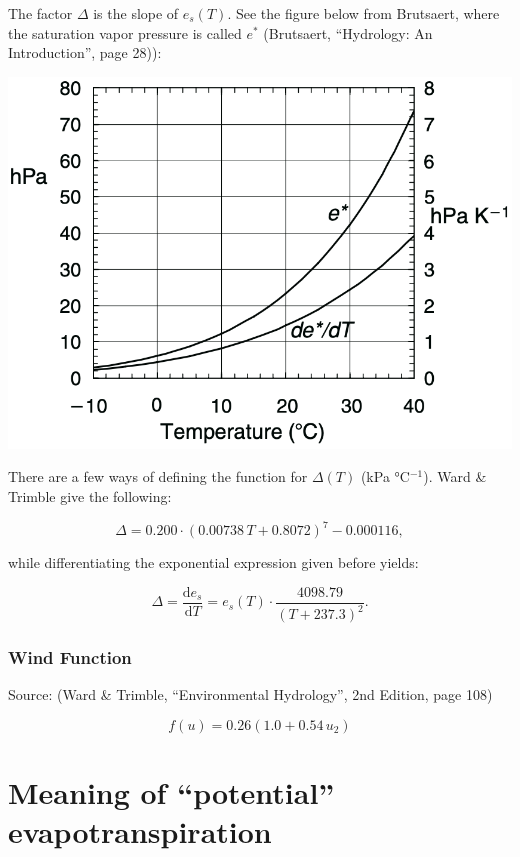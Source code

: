 \documentclass[
  letterpaper,
  DIV=11,
  numbers=noendperiod]{scrreprt}
\begin{document}
The factor \(\Delta\) is the slope of \(e_s(T)\). See the figure below
from Brutsaert, where the saturation vapor pressure is called \(e^*\)
(Brutsaert, ``Hydrology: An Introduction'', page 28)):

\includegraphics{archive/figures/brutsaert-fig2.1.png}

There are a few ways of defining the function for \(\Delta(T)\) (kPa
°C\(^{-1}\)). Ward \& Trimble give the following:

\[
  \begin{equation}
    \Delta = 0.200 \cdot (0.00738\,T + 0.8072)^7 - 0.000116,
  \end{equation}
\]

while differentiating the exponential expression given before yields:

\[
  \begin{equation}
    \Delta = \frac{\text{d} e_s}{\text{d}T} = e_s(T)\cdot \frac{4098.79}{(T+237.3)^2}.
  \end{equation}
\]

\hypertarget{wind-function}{%
\subsection{Wind Function}\label{wind-function}}

Source: (Ward \& Trimble, ``Environmental Hydrology'', 2nd Edition, page
108)

\[
  \begin{equation}
    f(u) = 0.26(1.0 + 0.54\, u_2)
  \end{equation}
\]

\hypertarget{meaning-of-potential-evapotranspiration}{%
\chapter{Meaning of ``potential''
evapotranspiration}\label{meaning-of-potential-evapotranspiration}}
\end{document}
